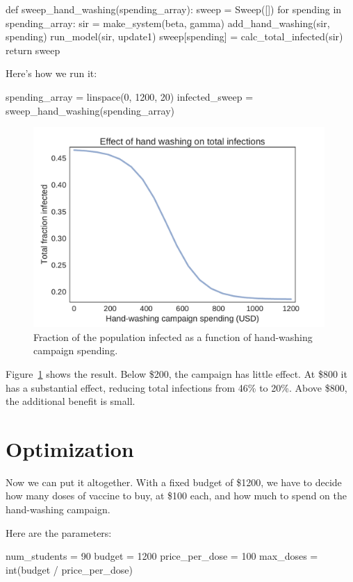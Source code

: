 \documentclass[12pt]{book}
\theoremstyle{exercise}
\begin{document}
\begin{python}
def sweep_hand_washing(spending_array):
    sweep = Sweep([])
    for spending in spending_array:
        sir = make_system(beta, gamma)
        add_hand_washing(sir, spending)
        run_model(sir, update1)
        sweep[spending] = calc_total_infected(sir)
    return sweep
\end{python}

Here's how we run it:

\begin{python}
spending_array = linspace(0, 1200, 20)
infected_sweep = sweep_hand_washing(spending_array)
\end{python}

\begin{figure}
\centerline{\includegraphics[height=3in]{figs/chap05-fig05.pdf}}
\caption{Fraction of the population infected as a function of hand-washing campaign spending.}
\label{chap05-fig05}
\end{figure} 

Figure~\ref{chap05-fig05} shows the result.  Below \$200, the campaign has little effect.  At \$800 it has a substantial effect, reducing total infections from 46\% to 20\%.  Above \$800, the additional benefit is small.

\section{Optimization} 

Now we can put it altogether.  With a fixed budget of \$1200, we have to decide how many doses of vaccine to buy, at \$100 each, and how much to spend on the hand-washing campaign.

Here are the parameters:

\begin{python}
num_students = 90
budget = 1200
price_per_dose = 100
max_doses = int(budget / price_per_dose)
\end{python}
\end{document}
